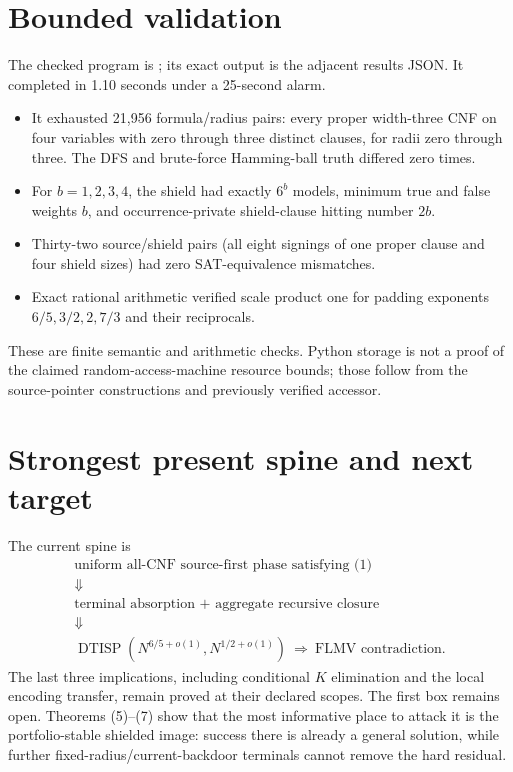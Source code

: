 \documentclass[11pt]{article}
\begin{document}
\section{Bounded validation}

The checked program is
;
its exact output is the adjacent results JSON.  It completed in 1.10 seconds
under a 25-second alarm.
\begin{itemize}
 \item It exhausted 21,956 formula/radius pairs: every proper width-three
 CNF on four variables with zero through three distinct clauses, for radii
 zero through three.  The DFS and brute-force Hamming-ball truth differed
 zero times.
 \item For $b=1,2,3,4$, the shield had exactly $6^b$ models, minimum true and
 false weights $b$, and occurrence-private shield-clause hitting number
 $2b$.
 \item Thirty-two source/shield pairs (all eight signings of one proper
 clause and four shield sizes) had zero SAT-equivalence mismatches.
 \item Exact rational arithmetic verified scale product one for padding
 exponents $6/5,3/2,2,7/3$ and their reciprocals.
\end{itemize}
These are finite semantic and arithmetic checks.  Python storage is not a
proof of the claimed random-access-machine resource bounds; those follow
from the source-pointer constructions and previously verified accessor.

\section{Strongest present spine and next target}

The current spine is
\[
 \begin{gathered}
 \boxed{\text{uniform all-CNF source-first phase satisfying (1)}}\\
 \Downarrow\\[-2pt]
 \boxed{\text{terminal absorption + aggregate recursive closure}}\\
 \Downarrow\\[-2pt]
 \boxed{\operatorname{DTISP}(N^{6/5+o(1)},N^{1/2+o(1)})}
 \ \Longrightarrow\ \boxed{\text{FLMV contradiction}}.
 \end{gathered}
\]
The last three implications, including conditional $K$ elimination and the
local encoding transfer, remain proved at their declared scopes.  The first
box remains open.  Theorems (5)--(7) show that the most informative place to
attack it is the portfolio-stable shielded image: success there is already a
general solution, while further fixed-radius/current-backdoor terminals
cannot remove the hard residual.
\end{document}
